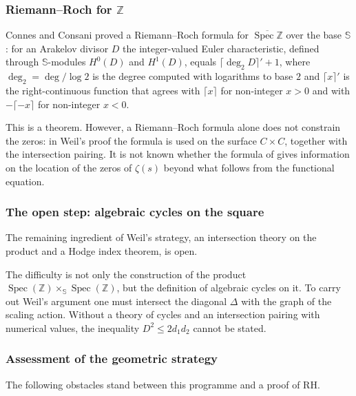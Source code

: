 \documentclass[11pt]{amsart}
\theoremstyle{definition}
\theoremstyle{remark}
\begin{document}
\subsubsection{Riemann--Roch for \texorpdfstring{$\mathbb{Z}$}{Z}}

Connes and Consani \cite{connes2024} proved a Riemann--Roch formula for $\overline{\operatorname{Spec}\mathbb{Z}}$ over the base $\mathbb{S}$: for an Arakelov divisor $D$ the integer-valued Euler characteristic, defined through $\mathbb{S}$-modules $H^0(D)$ and $H^1(D)$, equals $\lceil\deg_2D\rceil'+1$, where $\deg_2=\deg/\log 2$ is the degree computed with logarithms to base $2$ and $\lceil x\rceil'$ is the right-continuous function that agrees with $\lceil x\rceil$ for non-integer $x>0$ and with $-\lceil -x\rceil$ for non-integer $x<0$.

This is a theorem. However, a Riemann--Roch formula alone does not constrain the zeros: in Weil's proof the formula is used on the surface $C\times C$, together with the intersection pairing. It is not known whether the formula of \cite{connes2024} gives information on the location of the zeros of $\zeta(s)$ beyond what follows from the functional equation.

\subsubsection{The open step: algebraic cycles on the square}

The remaining ingredient of Weil's strategy, an intersection theory on the product and a Hodge index theorem, is open.

The difficulty is not only the construction of the product $\operatorname{Spec}(\mathbb{Z}) \times_{\mathbb{S}} \operatorname{Spec}(\mathbb{Z})$, but the definition of algebraic cycles on it. To carry out Weil's argument one must intersect the diagonal $\Delta$ with the graph of the scaling action. Without a theory of cycles and an intersection pairing with numerical values, the inequality $D^2 \le 2d_1d_2$ cannot be stated.

\subsubsection{Assessment of the geometric strategy}\label{sec:cc-critique}

The following obstacles stand between this programme and a proof of RH.
\end{document}
